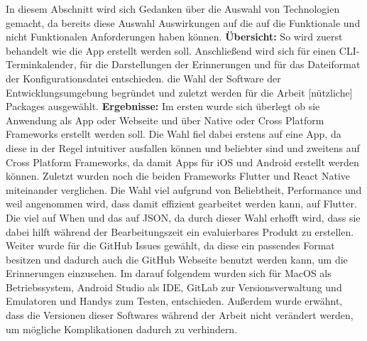 \myCheckmark
In diesem Abschnitt wird sich Gedanken über die Auswahl von Technologien gemacht, da bereits diese Auswahl Auswirkungen auf die auf die Funktionale und nicht Funktionalen Anforderungen haben können.\newline%
\textbf{Übersicht:} %
So wird zuerst behandelt wie die App erstellt werden soll. Anschließend wird sich für einen CLI-Terminkalender, für die Darstellungen der Erinnerungen und für das Dateiformat der Konfigurationsdatei entschieden. die Wahl der Software der Entwicklungsumgebung begründet und zuletzt werden für die Arbeit [nützliche] Packages ausgewählt.\newline%
\textbf{Ergebnisse:} %
	Im ersten  wurde sich überlegt ob sie Anwendung als App oder Webseite und über Native oder Cross Platform Frameworks erstellt werden soll. Die Wahl fiel dabei erstens auf eine App, da diese in der Regel intuitiver ausfallen können und beliebter sind und zweitens auf Cross Platform Frameworks, da damit Apps für iOS und Android erstellt werden können. Zuletzt wurden noch die beiden Frameworks Flutter und React Native miteinander verglichen. Die Wahl viel aufgrund von Beliebtheit, Performance und weil angenommen wird, dass damit effizient gearbeitet werden kann, auf Flutter.\newline%
	Die  viel auf When und das  auf JSON, da durch dieser Wahl erhofft wird, dass sie dabei hilft während der Bearbeitungszeit ein evaluierbares Produkt zu erstellen.
	Weiter wurde für die  GitHub Issues gewählt, da diese ein passendes Format besitzen und dadurch auch die GitHub Webseite benutzt werden kann, um die Erinnerungen einzusehen.\newline%
	Im darauf folgendem  wurden sich für MacOS als Betriebssystem, Android Studio als IDE, GitLab zur Versionsverwaltung und Emulatoren und Handys zum Testen, entschieden. Außerdem wurde erwähnt, dass die Versionen dieser Softwares während der Arbeit nicht verändert werden, um mögliche Komplikationen dadurch zu verhindern.\newline%
